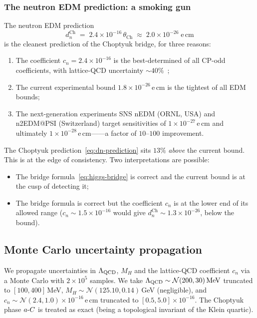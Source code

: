 \subsubsection*{The neutron EDM prediction: a smoking gun}

The neutron EDM prediction
\begin{equation}\label{eq:dn-prediction}
  \boxed{\;
  d_n^{\mathrm{Ch}}\;=\;2.4\times 10^{-16}\,\theta_{\mathrm{Ch}}
  \;\approx\;2.0\times 10^{-26}\;\mathrm{e\,cm}\;}
\end{equation}
is the cleanest prediction of the Choptyuk bridge, for three reasons:
\begin{enumerate}[leftmargin=2em,itemsep=0.1em]
  \item The coefficient $c_n=2.4\times 10^{-16}$ is the best-determined
        of all CP-odd coefficients, with lattice-QCD uncertainty
        $\sim 40\%$~\cite{hoferichter2025nEDM};
  \item The current experimental bound $1.8\times 10^{-26}\,$e\,cm is the
        tightest of all EDM bounds;
  \item The next-generation experiments SNS nEDM (ORNL, USA) and
        n2EDM@PSI (Switzerland) target sensitivities of
        $1\times 10^{-27}\,$e\,cm and ultimately
        $1\times 10^{-28}\,$e\,cm——a factor of $10$--$100$ improvement.
\end{enumerate}
The Choptyuk prediction~\eqref{eq:dn-prediction} sits $13\%$
\emph{above} the current bound.  This is at the edge of consistency.
Two interpretations are possible:
\begin{itemize}[leftmargin=2em,itemsep=0.1em]
  \item The bridge formula~\eqref{eq:higgs-bridge} is correct and the
        current bound is at the cusp of detecting it;
  \item The bridge formula is correct but the coefficient $c_n$ is at
        the lower end of its allowed range ($c_n\sim 1.5\times 10^{-16}$
        would give $d_n^{\mathrm{Ch}}\sim 1.3\times 10^{-26}$, below
        the bound).
\end{itemize}

\subsection{Monte Carlo uncertainty propagation}
\label{ssec:monte-carlo}

We propagate uncertainties in $\Lambda_{\mathrm{QCD}}$, $M_H$ and the lattice-QCD
coefficient $c_n$ via a Monte Carlo with $2\times 10^5$ samples.  We take
$\Lambda_{\mathrm{QCD}}\sim\mathcal N(200,30)\,\mathrm{MeV}$ truncated to $[100,400]\,$MeV,
$M_H\sim\mathcal N(125.10, 0.14)\,$GeV (negligible), and
$c_n\sim\mathcal N(2.4,1.0)\times 10^{-16}\,$e\,cm truncated to
$[0.5,5.0]\times 10^{-16}$.  The Choptyuk phase $a\text{-}C$ is treated as exact
(being a topological invariant of the Klein quartic).

